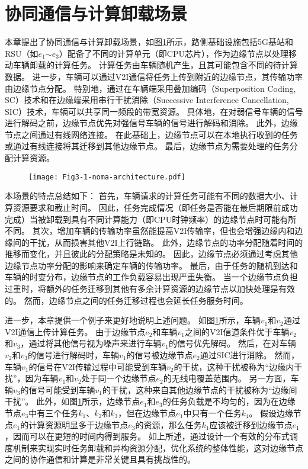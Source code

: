 \section{协同通信与计算卸载场景}\label{section 3-2}

本章提出了协同通信与计算卸载场景，如图\ref{fig 3-1}所示，路侧基础设施包括5G基站和RSU（如$e_1$$\sim$$e_3$）配备了不同的计算单元（即CPU芯片），作为边缘节点以处理移动车辆卸载的计算任务。
计算任务由车辆随机产生，且其可能包含不同的待计算数据。
进一步，车辆可以通过V2I通信将任务上传到附近的边缘节点，其传输功率由边缘节点分配。
特别地，通过在车辆端采用叠加编码（Superposition Coding, SC）技术和在边缘端采用串行干扰消除（Successive Interference Cancellation, SIC）\cite{khan2021noma}技术，车辆可以共享同一频段的带宽资源。
具体地，在对弱信号车辆的信号进行解码之前，边缘节点优先对强信号车辆的信号进行解码和消除。
此外，边缘节点之间通过有线网络连接。
在此基础上，边缘节点可以在本地执行收到的任务或通过有线连接将其迁移到其他边缘节点。
最后，边缘节点为需要处理的任务分配计算资源。

\begin{figure}[h]
\centering
  \texttt{[image: Fig3-1-noma-architecture.pdf]}
  \label{fig 3-1}
\end{figure} 

本场景的特点总结如下：
首先，车辆请求的计算任务可能有不同的数据大小、计算资源要求和截止时间。
因此，任务完成情况（即任务是否能在最后期限前成功完成）当被卸载到具有不同计算能力（即CPU时钟频率）的边缘节点时可能有所不同。
其次，增加车辆的传输功率虽然能提高V2I传输率，但也会增强边缘内和边缘间的干扰，从而损害其他V2I上行链路。
此外，边缘节点的功率分配随着时间的推移而变化，并且彼此的分配策略是未知的。
因此，边缘节点必须通过考虑其他边缘节点功率分配的影响来确定车辆的传输功率。
最后，由于任务的随机到达和车辆的时变分布，边缘节点的工作负载容易出现严重失衡。
当一个边缘节点负担过重时，将额外的任务迁移到其他有多余计算资源的边缘节点以加快处理是有效的。
然而，边缘节点之间的任务迁移过程也会延长任务服务时间。

进一步，本章提供一个例子来更好地说明上述问题。
如图\ref{fig 3-1}所示，车辆$v_1$和$v_2$通过V2I通信上传计算任务。
由于边缘节点$e_2$和车辆$v_1$之间的V2I信道条件优于车辆$v_2$和$v_3$，通过将其他信号视为噪声来进行车辆$v_1$的信号优先解码。
然后，在对车辆$v_2$和$v_3$的信号进行解码时，车辆$v_1$的信号被边缘节点$e_2$通过SIC进行消除。
然而，车辆$v_1$的信号在V2I传输过程中可能受到车辆$v_2$的干扰，这种干扰被称为“边缘内干扰”，因为车辆$v_1$和$v_2$处于同一个边缘节点$e_2$的无线电覆盖范围内。
另一方面，车辆$v_3$的信号可能受到车辆$v_1$的干扰，这种来自其他边缘节点的干扰被称为“边缘间干扰”。
此外，如图\ref{fig 3-1}所示，边缘节点$e_1$和$e_3$的任务负载是不均匀的，因为在边缘节点$e_3$中有三个任务$k_1$、$k_2$和$k_3$，但在边缘节点$e_1$中只有一个任务$k_4$。
假设边缘节点$e_1$的计算资源明显多于边缘节点$e_3$的资源，那么任务$k_1$应该被迁移到边缘节点$e_1$，因而可以在更短的时间内得到服务。
如上所述，通过设计一个有效的分布式调度机制来实现实时任务卸载和异构资源分配，优化系统的整体性能，这对边缘节点之间的协作通信和计算是非常关键且具有挑战性的。

